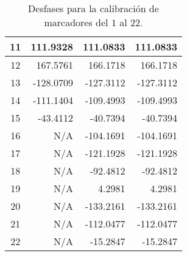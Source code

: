 \begin{table}[H]
\begin{tabular}{|c|rrr|}
		11                                 & \multicolumn{1}{r|}{111.9328}             & \multicolumn{1}{r|}{111.0833}             & 111.0833                                \\ \hline
		12                                 & \multicolumn{1}{r|}{167.5761}             & \multicolumn{1}{r|}{166.1718}             & 166.1718                                \\ \hline
		13                                 & \multicolumn{1}{r|}{-128.0709}            & \multicolumn{1}{r|}{-127.3112}            & -127.3112                               \\ \hline
		14                                 & \multicolumn{1}{r|}{-111.1404}            & \multicolumn{1}{r|}{-109.4993}            & -109.4993                               \\ \hline
		15                                 & \multicolumn{1}{r|}{-43.4112}             & \multicolumn{1}{r|}{-40.7394}             & -40.7394                                \\ \hline
		16                                 & \multicolumn{1}{r|}{N/A}                  & \multicolumn{1}{r|}{-104.1691}            & -104.1691                               \\ \hline
		17                                 & \multicolumn{1}{r|}{N/A}                  & \multicolumn{1}{r|}{-121.1928}            & -121.1928                               \\ \hline
		18                                 & \multicolumn{1}{r|}{N/A}                  & \multicolumn{1}{r|}{-92.4812}             & -92.4812                                \\ \hline
		19                                 & \multicolumn{1}{r|}{N/A}                  & \multicolumn{1}{r|}{4.2981}               & 4.2981                                  \\ \hline
		20                                 & \multicolumn{1}{r|}{N/A}                  & \multicolumn{1}{r|}{-133.2161}            & -133.2161                               \\ \hline
		21                                 & \multicolumn{1}{r|}{N/A}                  & \multicolumn{1}{r|}{-112.0477}            & -112.0477                               \\ \hline
		22                                 & \multicolumn{1}{r|}{N/A}                  & \multicolumn{1}{r|}{-15.2847}             & -15.2847                                \\ \hline
	\end{tabular}
	\caption{Desfases para la calibración de marcadores del $1$ al $22$.}
	\label{cuadro:desfases_finales}
\end{table}

